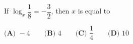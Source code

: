 If $\log_x\dfrac{1}{8}=-\dfrac{3}{2}$, then $x$ is equal to

$\textbf{(A) }-4\qquad\textbf{(B) }4\qquad\textbf{(C) }\dfrac{1}{4}\qquad\textbf{(D) }10$
